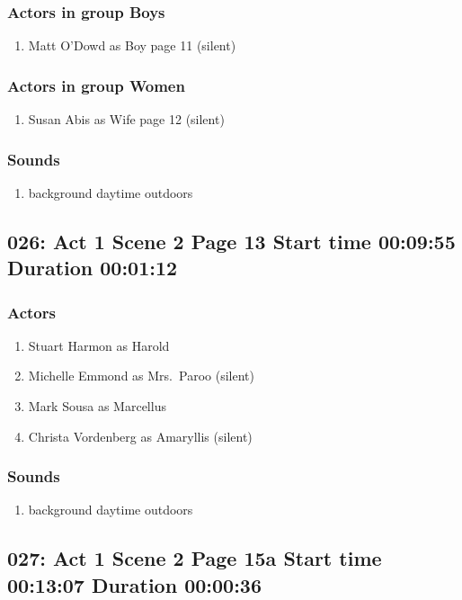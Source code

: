 \subsubsection{Actors in group Boys}
\begin{enumerate}
\item Matt O'Dowd as Boy page 11 (silent)
\end{enumerate}
\subsubsection{Actors in group Women}
\begin{enumerate}
\item Susan Abis as Wife page 12 (silent)
\end{enumerate}

\subsubsection{Sounds}
\begin{enumerate}
\item background daytime outdoors
\end{enumerate}
\subsection{026: Act 1 Scene 2 Page 13 Start time 00:09:55 Duration 00:01:12}

\subsubsection{Actors}
\begin{enumerate}
\item Stuart Harmon as Harold
\item Michelle Emmond as Mrs.~Paroo (silent)
\item Mark Sousa as Marcellus
\item Christa Vordenberg as Amaryllis (silent)
\end{enumerate}

\subsubsection{Sounds}
\begin{enumerate}
\item background daytime outdoors
\end{enumerate}
\subsection{027: Act 1 Scene 2 Page 15a Start time 00:13:07 Duration 00:00:36}

